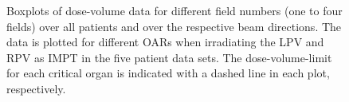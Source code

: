 \begin{figure}[H]
{ }
\caption{Boxplots of dose-volume data for different field numbers (one to four fields) over all patients and over the 
respective beam directions. The data is plotted for different OARs when irradiating the LPV and RPV as IMPT in the five patient data sets. 
The dose-volume-limit for each critical organ is indicated with a dashed line in each plot, respectively.}
\label{beamdirection_boxplot}
\end{figure}

\newpage


